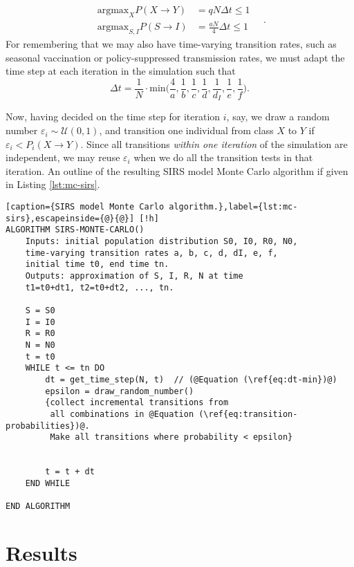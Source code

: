 \documentclass[]{article}
\begin{document}
\begin{equation}
\begin{aligned}
	\mathrm{argmax}_X  P(X \rightarrow Y) &= qN \Delta t \le 1 \\
	\mathrm{argmax}_{S,I} P(S \rightarrow I) &= \frac{aN}{4} \Delta t \le 1
\end{aligned} \quad .
\end{equation}
For remembering that we may also have time-varying transition rates, such as seasonal vaccination or policy-suppressed transmission rates, we must adapt the time step at each iteration in the simulation such that
\begin{equation} \label{eq:dt-min}
	\Delta t = \frac{1}{N} \cdot \mathrm{min} \bigg( \frac{4}{a}, \frac{1}{b}, \frac{1}{c}, \frac{1}{d}, \frac{1}{d_I}, \frac{1}{e}, \frac{1}{f} \bigg).
\end{equation}

Now, having decided on the time step for iteration $i$, say, we draw a random number $\varepsilon_i \sim \mathcal{U}(0,1)$, and transition one individual from class $X$ to $Y$ if $\varepsilon_i < P_i(X \rightarrow Y)$. Since all transitions \textit{within one iteration} of the simulation are independent, we may reuse $\varepsilon_i$ when we do all the transition tests in that iteration. An outline of the resulting SIRS model Monte Carlo algorithm if given in Listing \ref{lst:mc-sirs}. 

\begin{lstlisting}[caption={SIRS model Monte Carlo algorithm.},label={lst:mc-sirs},escapeinside={@}{@}] [!h]
ALGORITHM SIRS-MONTE-CARLO()
	Inputs: initial population distribution S0, I0, R0, N0,
	time-varying transition rates a, b, c, d, dI, e, f,
	initial time t0, end time tn.
	Outputs: approximation of S, I, R, N at time
	t1=t0+dt1, t2=t0+dt2, ..., tn.
	
	S = S0
	I = I0
	R = R0
	N = N0
	t = t0
	WHILE t <= tn DO
		dt = get_time_step(N, t)  // (@Equation (\ref{eq:dt-min})@)
		epsilon = draw_random_number()
		{collect incremental transitions from 
		 all combinations in @Equation (\ref{eq:transition-probabilities})@.
		 Make all transitions where probability < epsilon}
		
	
		t = t + dt
	END WHILE

END ALGORITHM
\end{lstlisting}


\section{Results} \label{sec:results}
\end{document}
